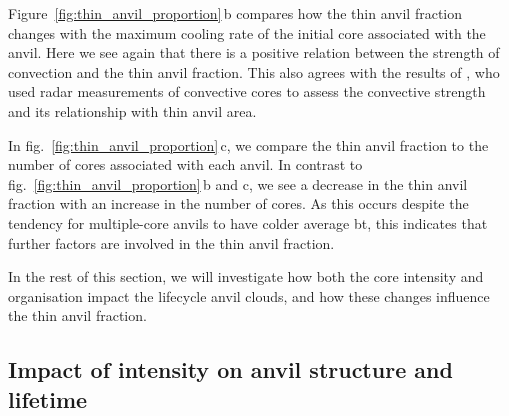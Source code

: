 Figure~\ref{fig:thin_anvil_proportion}\,b compares how the thin anvil fraction changes with the maximum cooling rate of the initial core associated with the anvil.
Here we see again that there is a positive relation between the strength of convection and the thin anvil fraction.
This also agrees with the results of \citet{takahashi_level_2017}, who used radar measurements of convective cores to assess the convective strength and its relationship with thin anvil area.

In fig.~\ref{fig:thin_anvil_proportion}\,c, we compare the thin anvil fraction to the number of cores associated with each anvil.
In contrast to fig.~\ref{fig:thin_anvil_proportion}\,b and c, we see a decrease in the thin anvil fraction with an increase in the number of cores.
As this occurs despite the tendency for multiple-core anvils to have colder average \acrshort{bt}, this indicates that further factors are involved in the thin anvil fraction.

In the rest of this section, we will investigate how both the core intensity and organisation impact the lifecycle anvil clouds, and how these changes influence the thin anvil fraction.

\subsection{Impact of intensity on anvil structure and lifetime}

